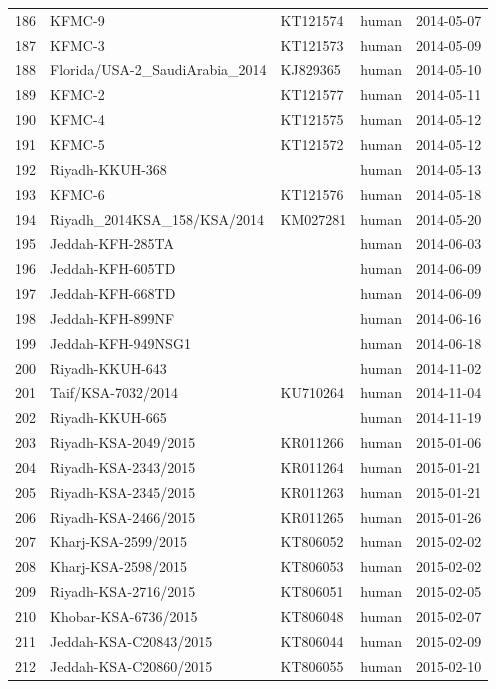 \documentclass[9pt,lineno]{elife}
\begin{document}
\begin{longtable}{ | r | l | p{2cm} | l | l | }
  186 & KFMC-9 & KT121574 & human & 2014-05-07 \\
  187 & KFMC-3 & KT121573 & human & 2014-05-09 \\
  188 & Florida/USA-2\_SaudiArabia\_2014 & KJ829365 & human & 2014-05-10 \\
  189 & KFMC-2 & KT121577 & human & 2014-05-11 \\
  190 & KFMC-4 & KT121575 & human & 2014-05-12 \\
  191 & KFMC-5 & KT121572 & human & 2014-05-12 \\
  192 & Riyadh-KKUH-368 &  & human & 2014-05-13 \\
  193 & KFMC-6 & KT121576 & human & 2014-05-18 \\
  194 & Riyadh\_2014KSA\_158/KSA/2014 & KM027281 & human & 2014-05-20 \\
  195 & Jeddah-KFH-285TA &  & human & 2014-06-03 \\
  196 & Jeddah-KFH-605TD &  & human & 2014-06-09 \\
  197 & Jeddah-KFH-668TD &  & human & 2014-06-09 \\
  198 & Jeddah-KFH-899NF &  & human & 2014-06-16 \\
  199 & Jeddah-KFH-949NSG1 &  & human & 2014-06-18 \\
  200 & Riyadh-KKUH-643 &  & human & 2014-11-02 \\
  201 & Taif/KSA-7032/2014 & KU710264 & human & 2014-11-04 \\
  202 & Riyadh-KKUH-665 &  & human & 2014-11-19 \\
  203 & Riyadh-KSA-2049/2015 & KR011266 & human & 2015-01-06 \\
  204 & Riyadh-KSA-2343/2015 & KR011264 & human & 2015-01-21 \\
  205 & Riyadh-KSA-2345/2015 & KR011263 & human & 2015-01-21 \\
  206 & Riyadh-KSA-2466/2015 & KR011265 & human & 2015-01-26 \\
  207 & Kharj-KSA-2599/2015 & KT806052 & human & 2015-02-02 \\
  208 & Kharj-KSA-2598/2015 & KT806053 & human & 2015-02-02 \\
  209 & Riyadh-KSA-2716/2015 & KT806051 & human & 2015-02-05 \\
  210 & Khobar-KSA-6736/2015 & KT806048 & human & 2015-02-07 \\
  211 & Jeddah-KSA-C20843/2015 & KT806044 & human & 2015-02-09 \\
  212 & Jeddah-KSA-C20860/2015 & KT806055 & human & 2015-02-10 \\

\end{longtable}
\end{document}
